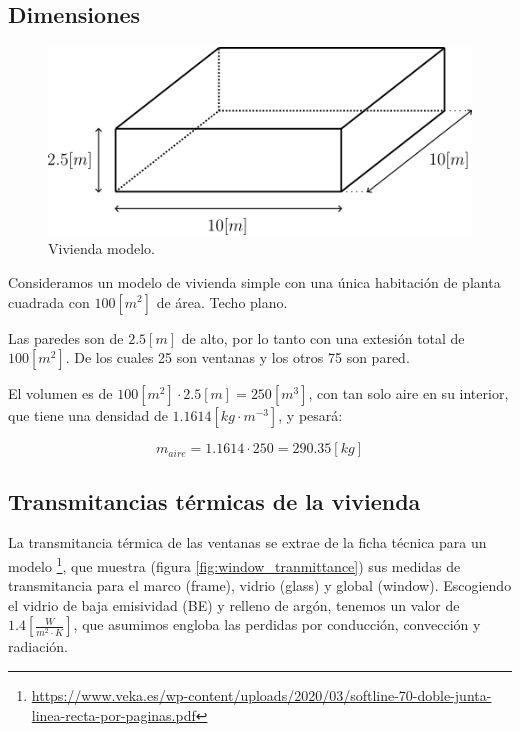 \subsection{Dimensiones}

\begin{figure}[h] \centering
	\centering
	\includegraphics[width=1\textwidth]{./capitulos/resultados_discusion/images/modelo_vivienda.png}
	\caption{Vivienda modelo.}
	\label{fig:modelo_vivienda}
\end{figure}

Consideramos un modelo de vivienda simple con una única habitación de planta
cuadrada con $100[m^2]$ de área. Techo plano.

Las paredes son de $2.5[m]$ de alto, por lo tanto con una extesión total de
$100[m^2]$. De los cuales 25 son ventanas y los otros 75 son pared.

El volumen es de $100[m^2] \cdot 2.5[m] = 250[m^3]$, con
tan solo aire en su interior, que tiene una densidad de
$1.1614[kg \cdot m^{-3}]$, y pesará:

\begin{equation}
	m_{aire} = 1.1614 \cdot 250 = 290.35[kg]
\end{equation}



\subsection{Transmitancias térmicas de la vivienda}

La transmitancia térmica de las ventanas se extrae de la ficha técnica para un
modelo
\footnote{\url{https://www.veka.es/wp-content/uploads/2020/03/softline-70-doble-junta-linea-recta-por-paginas.pdf}},
que muestra (figura \ref{fig:window_tranmittance}) sus medidas de transmitancia
para el marco (frame), vidrio (glass) y global (window). Escogiendo el vidrio
de baja emisividad (BE) y relleno de argón, tenemos un valor de
$1.4\left[\frac{W}{m^2 \cdot K}\right]$, que asumimos engloba las perdidas por
conducción, convección y radiación.


